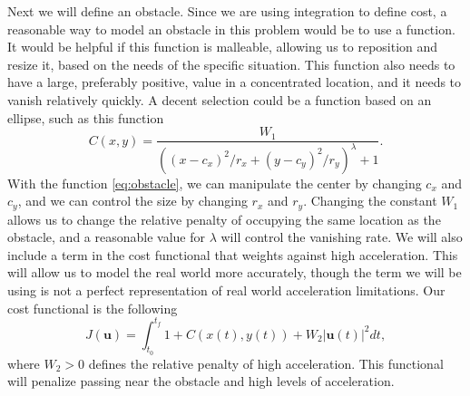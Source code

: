 Next we will define an obstacle.
Since we are using integration to define cost, a reasonable way to model an obstacle in this problem would be to use a function.
It would be helpful if this function is malleable, allowing us to reposition and resize it, based on the needs of the specific situation.
This function also needs to have a large, preferably positive, value in a concentrated location, and it needs to vanish relatively quickly.
A decent selection could be a function based on an ellipse, such as this function
\begin{equation}\label{eq:obstacle}
    C(x,y) = \frac{W_1}{((x-c_x)^2 / r_x + (y - c_y)^2 / r_y)^\lambda + 1}.
\end{equation}
With the function \ref{eq:obstacle}, we can manipulate the center by changing $c_x$ and $c_y$, and we can control the size by changing $r_x$ and $r_y$.
Changing the constant $W_1$ allows us to change the relative penalty of occupying the same location as the obstacle, and a reasonable value for $\lambda$ will control the vanishing rate.
We will also include a term in the cost functional that weights against high acceleration.
This will allow us to model the real world more accurately, though the term we will be using is not a perfect representation of real world acceleration limitations.
Our cost functional is the following
\begin{equation}\label{eq:ex-cost-func}
    J(\boldsymbol{u}) = \int_{t_0}^{t_f}1 + C(x(t),y(t)) + W_2\left|\boldsymbol{u}(t)\right|^2 dt,
\end{equation}
where $W_2>0$ defines the relative penalty of high acceleration.
This functional will penalize passing near the obstacle and high levels of acceleration.

